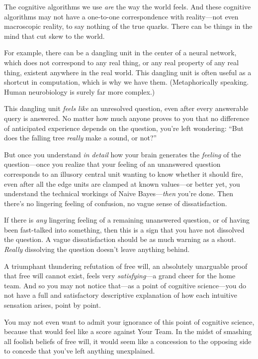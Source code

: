 {
 The cognitive algorithms we use \textit{are} the way the world
feels. And these cognitive algorithms may not have a one-to-one
correspondence with reality---not even macroscopic reality, to say
nothing of the true quarks. There can be things in the mind that cut
skew to the world.}

{
 For example, there can be a dangling unit in the center of a
neural network, which does not correspond to any real thing, or any
real property of any real thing, existent anywhere in the real world.
This dangling unit is often useful as a shortcut in computation, which
is why we have them. (Metaphorically speaking. Human neurobiology is
surely far more complex.)}

{
 This dangling unit \textit{feels like} an unresolved question,
even after every answerable query is answered. No matter how much
anyone proves to you that no difference of anticipated experience
depends on the question, you're left wondering:
``But does the falling tree \textit{really} make a
sound, or not?''}

{
 But once you understand \textit{in detail} how your brain
generates the \textit{feeling} of the question---once you realize that
your feeling of an unanswered question corresponds to an illusory
central unit wanting to know whether it should fire, even after all the
edge units are clamped at known values---or better yet, you understand
the technical workings of Naive Bayes---\textit{then}
you're done. Then there's no lingering
feeling of confusion, no vague sense of dissatisfaction.}

{
 If there is \textit{any} lingering feeling of a remaining
unanswered question, or of having been fast-talked into something, then
this is a sign that you have not dissolved the question. A vague
dissatisfaction should be as much warning as a shout. \textit{Really}
dissolving the question doesn't leave anything behind.}

{
 A triumphant thundering refutation of free will, an absolutely
unarguable proof that free will cannot exist, feels very
\textit{satisfying}{}---a grand cheer for the home team. And so you may
not notice that---as a point of cognitive science---you do not have a
full and satisfactory descriptive explanation of how each intuitive
sensation arises, point by point.}

{
 You may not even want to admit your ignorance of this point of
cognitive science, because that would feel like a score against Your
Team. In the midst of smashing all foolish beliefs of free will, it
would seem like a concession to the opposing side to concede that
you've left anything unexplained.}


